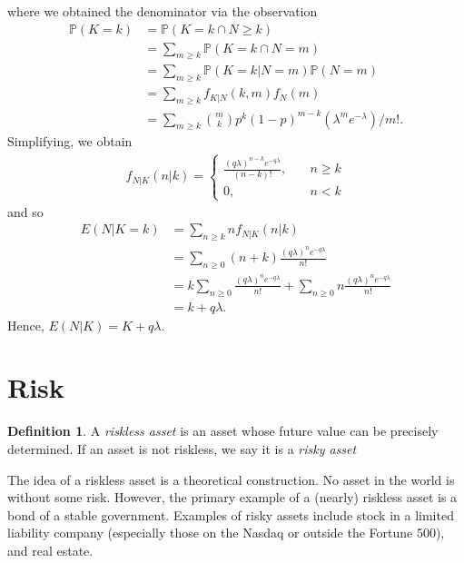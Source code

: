 \documentclass[12pt]{article}
\newcommand{\prob}{\mathbb{P}}
\theoremstyle{plain}
\theoremstyle{definition}
\newtheorem*{definition}{Definition}
\theoremstyle{remark}
\numberwithin{equation}{section}  %
\begin{document}
where we obtained the denominator via the observation
\begin{align*}
    \prob(K = k) & = \prob(K = k \cap N \ge k) 
    \\
    & = \sum_{m \ge k} \prob(K =
    k \cap N = m) 
    \\
    & = \sum_{m \ge k} \prob(K = k | N = m) \prob(N = m)
    \\
    & = \sum_{m \ge k} f_{K|N}(k, m) f_N(m)
    \\
    & = \sum_{m \ge k}
    \binom{m}{k} p^k {(1 - p)}^{m-k} (\lambda^m e^{-\lambda})/m!.
\end{align*}
Simplifying, we obtain
\begin{align*}
    f_{N|K}(n|k) = 
    \begin{cases}
        \frac{{(q\lambda)}^{n-k} e^{-q\lambda}}{(n-k)!}, \quad & n \ge k
        \\
        0, \quad & n<k
    \end{cases}
\end{align*}
and so 
\begin{align*}
    E(N | K = k) & = \sum_{n \ge k} n f_{N|K}(n | k)
    \\
    & = \sum_{n \ge 0} (n + k) \frac{{(q \lambda)}^n e^{-q\lambda}}{n!}
    \\
    & = k \sum_{n \ge 0} \frac{{(q \lambda)}^n e^{-q\lambda}}{n!} + \sum_{n \ge 0}
    n \frac{{(q\lambda)}^n e^{-q\lambda}}{n!} 
    \\
    & = k + q\lambda.
\end{align*}
Hence, $E(N|K) = K + q \lambda$.
\section{Risk}
\begin{definition}
    A \emph{riskless asset} is an asset whose future value can be precisely determined. If an asset is not riskless, we say it is a \emph{risky asset} 
\end{definition}
The idea of a riskless asset is a theoretical construction. No asset in the world is without some risk. However, the primary example of a (nearly) riskless asset is a bond of a stable government. Examples of risky assets include stock in a limited liability company (especially those on the Nasdaq or outside the Fortune 500),
and real estate.
\end{document}
